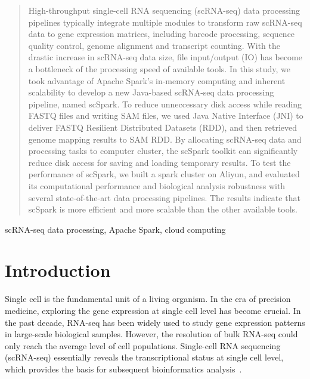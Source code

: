 \documentclass[conference]{IEEEtran}
\begin{document}
\begin{abstract}
  High-throughput single-cell RNA sequencing (scRNA-seq) data processing pipelines typically integrate multiple modules to transform raw scRNA-seq data to gene expression matrices, including barcode processing, sequence quality control, genome alignment and transcript counting. 
  With the drastic increase in scRNA-seq data size, file input/output (IO) has become a bottleneck of the processing speed of available tools. 
  In this study, we took advantage of Apache Spark's in-memory computing and inherent scalability to develop a new Java-based scRNA-seq data processing pipeline, named scSpark. 
  To reduce unneccessary disk access while reading FASTQ files and writing SAM files, we used Java Native Interface (JNI) to deliver FASTQ Resilient Distributed Datasets (RDD), and then retrieved genome mapping results to SAM RDD. 
  By allocating scRNA-seq data and processing tasks to computer cluster, the scSpark toolkit can significantly reduce disk access for saving and loading temporary results. 
  To test the performance of scSpark, we built a spark cluster on Aliyun, and evaluated its computational performance and biological analysis robustness with several state-of-the-art data processing pipelines. The results indicate that scSpark is more efficient and more scalable than the other available tools. 
\end{abstract}

\begin{IEEEkeywords}
scRNA-seq data processing, Apache Spark, cloud computing
\end{IEEEkeywords}

\section{Introduction}
Single cell is the fundamental unit of a living organism.
In the era of precision medicine, exploring the gene expression at single cell level has become crucial.
In the past decade, RNA-seq has been widely used to study gene expression patterns in large-scale biological samples.
However, the resolution of bulk RNA-seq could only reach the average level of cell populations.
Single-cell RNA sequencing (scRNA-seq) essentially reveals the transcriptional status at single cell level, which provides the basis for subsequent bioinformatics analysis~\cite{Papalexi2018SinglecellRS}.
\end{document}
